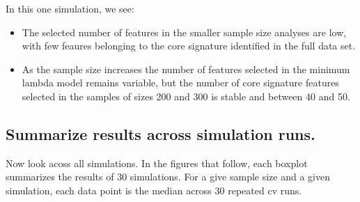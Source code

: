 \documentclass[
]{book}
\begin{document}
In this one simulation, we see:

\begin{itemize}
\item
  The selected number of features in the smaller sample size analyses
  are low, with few feaures belonging to the core signature identified in the
  full data set.
\item
  As the sample size increases the number of features selected in the minimum
  lambda model remains variable, but the number of core signature features
  selected in the samples of sizes 200 and 300 is stable and between 40 and 50.
\end{itemize}

\hypertarget{summarize-results-across-simulation-runs.}{%
\subsection{Summarize results across simulation runs.}\label{summarize-results-across-simulation-runs.}}

Now look acoss all simulations. In the figures that follow, each boxplot
summarizes the results of 30 simulations. For a give sample size and a
given simulation, each data point is the median across 30 repeated cv runs.
\end{document}
